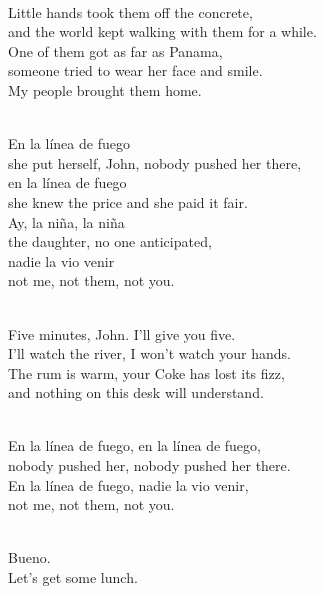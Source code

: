 \begin{lyrics}
\\
Little hands took them off the concrete,\\
and the world kept walking with them for a while.\\
One of them got as far as Panama,\\
someone tried to wear her face and smile.\\
My people brought them home.

\\
En la línea de fuego
\\
she put herself, John, nobody pushed her there,
\\
en la línea de fuego
\\
she knew the price and she paid it fair.
\\
Ay, la niña, la niña
\\
the daughter, no one anticipated,
\\
nadie la vio venir
\\
not me, not them, not you.

\\
Five minutes, John. I'll give you five.\\
I'll watch the river, I won't watch your hands.\\
The rum is warm, your Coke has lost its fizz,\\
and nothing on this desk will understand.

\\
En la línea de fuego, en la línea de fuego,
\\
nobody pushed her, nobody pushed her there.
\\
En la línea de fuego, nadie la vio venir,
\\
not me, not them, not you.

\\
Bueno.\\
Let's get some lunch.
\end{lyrics}


